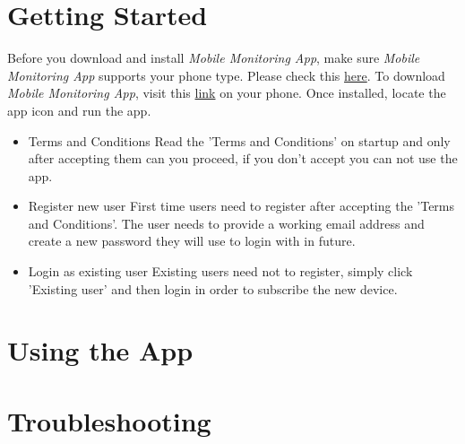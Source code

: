 \documentclass[hidelinks, 12pt, oneside]{article}
\begin{document}
	\section{Getting Started}
	Before you download and install \emph{Mobile Monitoring App}, make sure \emph{Mobile Monitoring App} supports
	 your phone type. Please check this \href{https://}{\color{blue}here}.\newline\newline
	 To download \emph{Mobile Monitoring App}, visit this \href{https://}{\color{blue}link} on your phone. Once
	 installed, locate the app icon and run the app.\
	 \begin{itemize}
	 	\item Terms and Conditions\newline
	 	Read the 'Terms and Conditions' on startup and only after accepting them can you proceed, if you
	 	 don't accept you can not use the app.
	 	\item Register new user\newline
	 	First time users need to register after accepting the 'Terms and Conditions'. The user needs to provide
	 	 a working email address and create a new password they will use to login with in future.
	 	\item Login as existing user\newline
	 	Existing users need not to register, simply click 'Existing user' and then login in order to subscribe the 
	 	new device.
	 \end{itemize}
	 \newpage
	 
	 
	\section{Using the App}\newpage
	
	\section{Troubleshooting}\newpage
			
\end{document}
